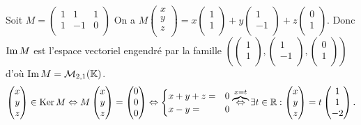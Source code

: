 \documentclass{book}
\begin{document}
\begin{Exemple}
Soit $M=\begin{pmatrix}
1&1&1\\
1&-1&0\\
\end{pmatrix}$
On a $M\begin{pmatrix}x \\y \\z\\\end{pmatrix}=x\begin{pmatrix}1\\1\\ \end{pmatrix}+y\begin{pmatrix}1\\-1\\ \end{pmatrix}+z\begin{pmatrix}0\\1\\ \end{pmatrix}$.
Donc $\operatorname{Im} M$ est l'espace vectoriel engendré par la famille $(\begin{pmatrix}1\\1\\ \end{pmatrix},\begin{pmatrix}1\\-1\\ \end{pmatrix},\begin{pmatrix}0\\1\\ \end{pmatrix})$ d'où $\operatorname{Im} M=\mathcal{M}_{2,1}(\mathbb{K})$.
$$\begin{pmatrix}x \\y \\z\\\end{pmatrix} \in \operatorname{Ker} M \Leftrightarrow M\begin{pmatrix}x \\y \\z\\\end{pmatrix}=\begin{pmatrix}0 \\0 \\0\\\end{pmatrix} \Leftrightarrow \begin{cases}x+y+z=&0\\x-y=&0\end{cases}\overbrace{\Leftrightarrow}^{x=t} \exists t \in \mathbb{R}: \begin{pmatrix}x \\y \\z\\\end{pmatrix}=t\begin{pmatrix}1 \\1 \\-2\\\end{pmatrix} .$$

\end{Exemple}
\end{document}
